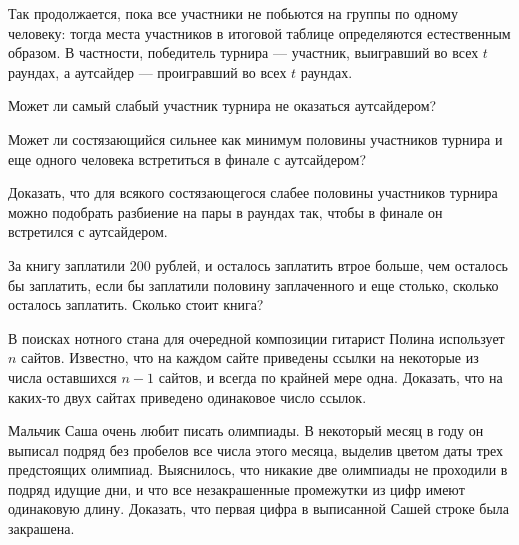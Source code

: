 \ms Так продолжается, пока все участники не побьются на группы по одному человеку: тогда места участников в итоговой таблице определяются естественным образом. В частности, победитель турнира — участник, выигравший во всех $t$ раундах, а аутсайдер — проигравший во всех $t$ раундах.

\begin{itemize}
\itA Может ли самый слабый участник турнира не оказаться аутсайдером?

\itB Может ли состязающийся сильнее как минимум половины участников турнира и еще одного человека встретиться в финале с аутсайдером?

\itC Доказать, что для всякого состязающегося слабее половины участников турнира можно подобрать разбиение на пары в раундах так, чтобы в финале он встретился с аутсайдером.
\end{itemize}

\begin{itemize}
\itA За книгу заплатили 200 рублей, и осталось заплатить втрое больше, чем осталось бы заплатить, если бы заплатили половину заплаченного и еще столько, сколько осталось заплатить. Сколько стоит книга?

\itB В поисках нотного стана для очередной композиции гитарист Полина использует $n$ сайтов. Известно, что на каждом сайте приведены ссылки на некоторые из числа оставшихся $n-1$ сайтов, и всегда по крайней мере одна. Доказать, что на каких-то двух сайтах приведено одинаковое число ссылок.

\itC Мальчик Саша очень любит писать олимпиады. В некоторый месяц в году он выписал подряд без пробелов все числа этого месяца, выделив цветом даты трех предстоящих олимпиад. Выяснилось, что никакие две олимпиады не проходили в подряд идущие дни, и что все незакрашенные промежутки из цифр имеют одинаковую длину. Доказать, что первая цифра в выписанной Сашей строке была закрашена.
\end{itemize}

